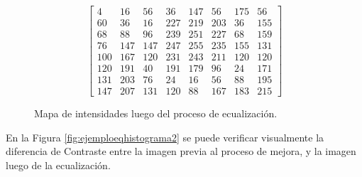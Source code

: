 \begin{figure}[H]
\centering
\[
\begin{bmatrix}
4   & 16  & 56  & 36  & 147 & 56  & 175 & 56 \\
60  & 36  & 16  & 227 & 219 & 203 & 36  & 155 \\
68  & 88  & 96  & 239 & 251 & 227 & 68  & 159 \\
76  & 147 & 147 & 247 & 255 & 235 & 155 & 131 \\
100 & 167 & 120 & 231 & 243 & 211 & 120 & 120 \\
120 & 191 & 40  & 191 & 179 & 96  & 24  & 171 \\
131 & 203 & 76  & 24  & 16  & 56  & 88  & 195 \\
147 & 207 & 131 & 120 & 88  & 167 & 183 & 215
\end{bmatrix}
\]
\caption{Mapa de intensidades luego del proceso de ecualización.}
\label{fig:mapaintmej}
\end{figure}

En la Figura \ref{fig:ejemploeqhistograma2} se puede verificar visualmente la diferencia de Contraste entre la imagen previa al proceso de mejora, y la imagen luego de la ecualización.

